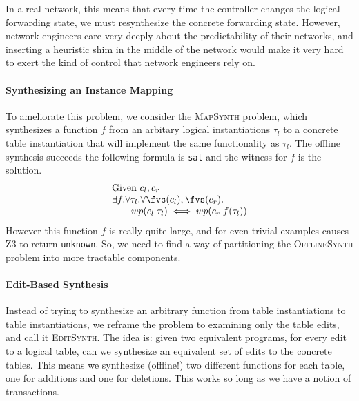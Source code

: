In a real network, this means that every time the
controller changes the logical forwarding state, we must resynthesize the
concrete forwarding state. However, network engineers care very deeply about the
predictability of their networks, and inserting a heuristic shim in the middle
of the network would make it very hard to exert the kind of control that network
engineers rely on.

\paragraph{Synthesizing an Instance Mapping} To ameliorate this problem, we consider the \textsc{MapSynth} problem, which
synthesizes a function $f$ from an arbitary logical instantiations $\tau_l$ to a
concrete table instantiation that will implement the same functionality as
$\tau_l$. The offline synthesis succeeds the following formula is \texttt{sat}
and the witness for $f$ is the solution.
\[\begin{array}{l}
    \text{Given } c_l,c_r\\
    \exists f. \forall \tau_l. \forall \fvs(c_l), \fvs(c_r). \\
    \qquad wp(c_l\; \tau_l) \iff wp(c_r\; f(\tau_l))
  \end{array}\]
However this function $f$ is really quite large, and for even trivial
examples causes Z3 to return \texttt{unknown}. So, we need to find a way of
partitioning the \textsc{OfflineSynth} problem into more tractable
components.

\paragraph{Edit-Based Synthesis} Instead of trying to synthesize an arbitrary
function from table instantiations to table instantiations, we reframe the
problem to examining only the table edits, and call it \textsc{EditSynth}. The
idea is: given two equivalent programs, for every edit to a logical table, can
we synthesize an equivalent set of edits to the concrete tables. This means we
synthesize (offline!) two different functions for each table, one for additions
and one for deletions. This works so long as we have a notion of transactions.



